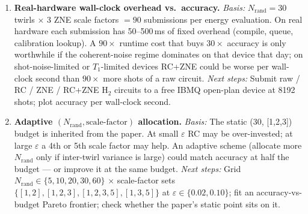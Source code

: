 \begin{enumerate}
  \item \textbf{Real-hardware wall-clock overhead vs.~accuracy.}
        \emph{Basis:} $N_{\text{rand}}\!=\!30$ twirls $\times$ 3 ZNE scale
        factors $= 90$ submissions per energy evaluation. On real hardware
        each submission has 50--500\,ms of fixed overhead (compile, queue,
        calibration lookup). A $90\times$ runtime cost that buys $30\times$
        accuracy is only worthwhile if the coherent-noise regime dominates on
        that device that day; on shot-noise-limited or $T_1$-limited devices
        RC+ZNE could be worse per wall-clock second than $90\times$ more shots
        of a raw circuit.
        \emph{Next steps:} Submit raw / RC / ZNE / RC+ZNE H$_2$ circuits to a
        free IBMQ open-plan device at 8192 shots; plot accuracy per wall-clock
        second.

  \item \textbf{Adaptive $(N_{\text{rand}},\text{scale-factor})$ allocation.}
        \emph{Basis:} The static (30, [1,2,3]) budget is inherited from the
        paper. At small $\varepsilon$ RC may be over-invested; at large
        $\varepsilon$ a 4th or 5th scale factor may help. An adaptive scheme
        (allocate more $N_{\text{rand}}$ only if inter-twirl variance is
        large) could match accuracy at half the budget --- or improve it at
        the same budget.
        \emph{Next steps:} Grid $N_{\text{rand}}\in\{5,10,20,30,60\}$ $\times$
        scale-factor sets $\{[1,2], [1,2,3], [1,2,3,5], [1,3,5]\}$ at
        $\varepsilon\in\{0.02,0.10\}$; fit an accuracy-vs-budget Pareto
        frontier; check whether the paper's static point sits on it.
\end{enumerate}
